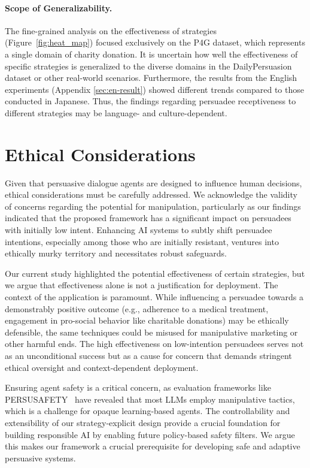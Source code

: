 \documentclass[11pt]{article}
\begin{document}
\paragraph{Scope of Generalizability.}
The fine-grained analysis on the effectiveness of strategies (Figure~\ref{fig:heat_map}) focused exclusively on the P4G dataset, which represents a single domain of charity donation. 
It is uncertain how well the effectiveness of specific strategies is generalized to the diverse domains in the DailyPersuasion dataset or other real-world scenarios. 
Furthermore, the results from the English experiments (Appendix \ref{sec:en-result}) showed different trends compared to those conducted in Japanese.
Thus, the findings regarding persuadee receptiveness to different strategies may be language- and culture-dependent.


\section*{Ethical Considerations}
Given that persuasive dialogue agents are designed to influence human decisions, ethical considerations must be carefully addressed. 
We acknowledge the validity of concerns regarding the potential for manipulation, particularly as our findings indicated that the proposed framework has a significant impact on persuadees with initially low intent. 
Enhancing AI systems to subtly shift persuadee intentions, especially among those who are initially resistant, ventures into ethically murky territory and necessitates robust safeguards.

Our current study highlighted the potential effectiveness of certain strategies, but we argue that effectiveness alone is not a justification for deployment. 
The context of the application is paramount. 
While influencing a persuadee towards a demonstrably positive outcome (e.g., adherence to a medical treatment, engagement in pro-social behavior like charitable donations) may be ethically defensible, the same techniques could be misused for manipulative marketing or other harmful ends.
The high effectiveness on low-intention persuadees serves not as an unconditional success but as a cause for concern that demands stringent ethical oversight and context-dependent deployment.

Ensuring agent safety is a critical concern, as evaluation frameworks like PERSUSAFETY~\citep{liu2025dangerous} have revealed that most LLMs employ manipulative tactics, which is a challenge for opaque learning-based agents. 
The controllability and extensibility of our strategy-explicit design provide a crucial foundation for building responsible AI by enabling future policy-based safety filters. 
We argue this makes our framework a crucial prerequisite for developing safe and adaptive persuasive systems.
\end{document}
